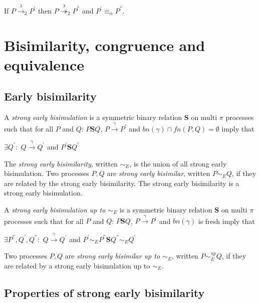 \begin{lemma}\label{pushAlfaEquivalence}
  If $P\xrightarrow{\lambda}_{2} P^{'}$ then $P\stackrel{\lambda}{\twoheadrightarrow}_{2} P^{''}$ and $P^{'}\equiv_{\alpha} P^{''}$.
\end{lemma}


\section{Bisimilarity, congruence and equivalence}

\subsection{Early bisimilarity}

\begin{definition}\label{strongEarlyBisimulation}
  A \emph{strong early bisimulation} is a symmetric binary relation $\mathbf{S}$ on multi $\pi$ processes such that for all $P$ and $Q$: $P \mathbf{S} Q$, $P \xrightarrow{\gamma} P^{'}$ and $bn(\gamma)\cap fn(P,Q)=\emptyset$ imply that
  \begin{center}
    $\exists Q^{'}:$ $Q \xrightarrow{\gamma} Q^{'}$ and $P^{'}\mathbf{S} Q^{'}$
  \end{center}
  The \emph{strong early bisimilarity}, written $\sim_{E}$, is the union of all strong early bisimulation. Two processes $P,Q$ are \emph{strong early bisimilar}, written $P \sim_{E} Q$, if they are related by the strong early bisimilarity. The strong early bisimilarity is a strong early bisimulation.
\end{definition}

\begin{definition}\label{strongEarlyBisimulationUpTo}
  A \emph{strong early bisimulation up to $\sim_{E}$} is a symmetric binary relation $\mathbf{S}$ on multi $\pi$ processes such that for all $P$ and $Q$: $P \mathbf{S} Q$, $P \xrightarrow{\gamma} P^{'}$ and $bn(\gamma)$ is fresh imply that
  \begin{center}
    $\exists P^{''},Q^{'},Q^{''}:$ $Q \xrightarrow{\gamma} Q^{'}$ and $P^{'} \sim_{E} P^{''} \mathbf{S} Q^{''} \sim_{E} Q^{'} $
  \end{center}
  Two processes $P,Q$ are \emph{strong early bisimilar up to $\sim_{E}$}, written $P \sim_{E}^{up} Q$, if they are related by a strong early bisimulation up to $\sim_{E}$.
\end{definition}

\subsection{Properties of strong early bisimilarity}

